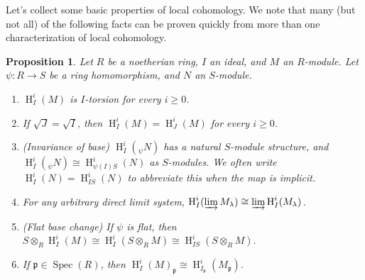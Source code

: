 \documentclass[11pt]{book}
\newtheorem{proposition}[theorem]{Proposition}
\numberwithin{equation}{section}
\numberwithin{theorem}{chapter}
\theoremstyle{definition}
\newtheorem*{basic properties}{Basic Properties}
\newtheorem*{Important Remark}{Important Remark}
\theoremstyle{remark}
\newcommand{\p}{\mathfrak{p}}
\newcommand{\Spec}{\operatorname{Spec}}
\renewcommand{\H}{\operatorname{H}}
\begin{document}
Let's collect some basic properties of local cohomology. We note that many (but not all) of the following facts can be proven quickly from more than one characterization of local cohomology.

\begin{proposition}
	Let $R$ be a noetherian ring, $I$ an ideal, and $M$ an $R$-module. 
	Let $\psi:R\to S$ be a ring homomorphism, and $N$ an $S$-module.
	\begin{enumerate}
		\item $\H^i_I(M)$ is $I$-torsion for every $i\geq 0$.
		\item If $\sqrt{J}=\sqrt{I}$, then $\H^i_I(M)=\H^i_J(M)$ for every $i\geq 0$.
		\item (Invariance of base) $\H^i_I(_\psi N)$ has a natural $S$-module structure, and $\H^i_I(_\psi N)\cong \H^i_{\psi(I)S}(N)$ as $S$-modules. We often write $\H^i_I(N)=\H^i_{IS}(N)$ to abbreviate this when the map is implicit.
		\item For any arbitrary direct limit system, $\H^i_I(\varinjlim M_\lambda) \cong \varinjlim \H^i_I(M_\lambda)$.
		\item (Flat base change) If $\psi$ is flat, then
		$ S \otimes_R \H^i_I(M)\cong \H^i_I(S \otimes_R M) \cong \H^i_{IS}(S \otimes_R M). $
		\item If $\p\in \Spec(R)$, then $\H^i_I(M)_\p \cong \H^i_{I_\p}(M_\p)$.
	\end{enumerate}
\end{proposition}
\end{document}
